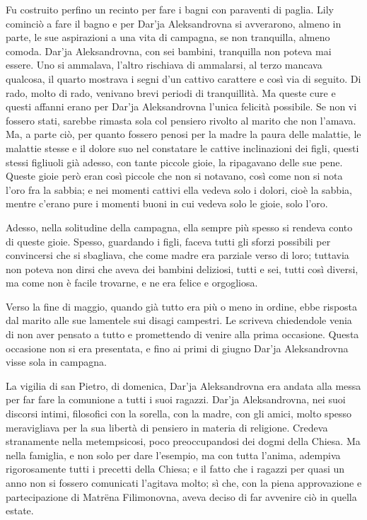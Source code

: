 Fu costruito perfino un recinto per fare i bagni con paraventi di paglia. Lily cominciò a fare il bagno e per Dar'ja Aleksandrovna si avverarono, almeno in parte, le sue aspirazioni a una vita di campagna, se non tranquilla, almeno comoda. Dar'ja Aleksandrovna, con sei bambini, tranquilla non poteva mai essere. Uno si ammalava, l'altro rischiava di ammalarsi, al terzo mancava qualcosa, il quarto mostrava i segni d'un cattivo carattere e così via di seguito. Di rado, molto di rado, venivano brevi periodi di tranquillità. Ma queste cure e questi affanni erano per Dar'ja Aleksandrovna l'unica felicità possibile. Se non vi fossero stati, sarebbe rimasta sola col pensiero rivolto al marito che non l'amava. Ma, a parte ciò, per quanto fossero penosi per la madre la paura delle malattie, le malattie stesse e il dolore suo nel constatare le cattive inclinazioni dei figli, questi stessi figliuoli già adesso, con tante piccole gioie, la ripagavano delle sue pene. Queste gioie però eran così piccole che non si notavano, così come non si nota l'oro fra la sabbia; e nei momenti cattivi ella vedeva solo i dolori, cioè la sabbia, mentre c'erano pure i momenti buoni in cui vedeva solo le gioie, solo l'oro. 

Adesso, nella solitudine della campagna, ella sempre più spesso si rendeva conto di queste gioie. Spesso, guardando i figli, faceva tutti gli sforzi possibili per convincersi che si sbagliava, che come madre era parziale verso di loro; tuttavia non poteva non dirsi che aveva dei bambini deliziosi, tutti e sei, tutti così diversi, ma come non è facile trovarne, e ne era felice e orgogliosa. 

Verso la fine di maggio, quando già tutto era più o meno in ordine, ebbe risposta dal marito alle sue lamentele sui disagi campestri. Le scriveva chiedendole venia di non aver pensato a tutto e promettendo di venire alla prima occasione. Questa occasione non si era presentata, e fino ai primi di giugno Dar'ja Aleksandrovna visse sola in campagna. 

La vigilia di san Pietro, di domenica, Dar'ja Aleksandrovna era andata alla messa per far fare la comunione a tutti i suoi ragazzi. Dar'ja Aleksandrovna, nei suoi discorsi intimi, filosofici con la sorella, con la madre, con gli amici, molto spesso meravigliava per la sua libertà di pensiero in materia di religione. Credeva stranamente nella metempsicosi, poco preoccupandosi dei dogmi della Chiesa. Ma nella famiglia, e non solo per dare l'esempio, ma con tutta l'anima, adempiva rigorosamente tutti i precetti della Chiesa; e il fatto che i ragazzi per quasi un anno non si fossero comunicati l'agitava molto; sì che, con la piena approvazione e partecipazione di Matrëna Filimonovna, aveva deciso di far avvenire ciò in quella estate. 

